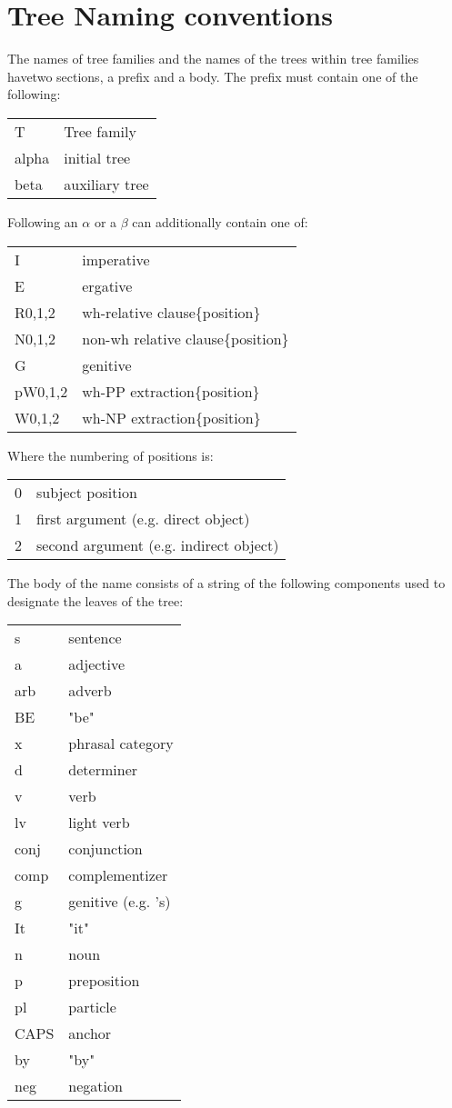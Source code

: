 \appendix
\section{Tree Naming conventions}

The names of tree families and the names of the trees within tree families havetwo sections, a prefix and a body. The prefix must contain one of the following:

\begin{tabular}{ll}
T&Tree family\\
alpha&initial tree\\
beta&auxiliary tree\\
\end{tabular}

Following an $\alpha$ or a $\beta$ can additionally contain one of:

\begin{tabular}{ll}
I&imperative\\
E&ergative\\
R{0,1,2}&wh-relative clause\{position\}\\
N{0,1,2}&non-wh relative clause\{position\}\\
G&genitive\\
pW{0,1,2}&wh-PP extraction\{position\}\\
W{0,1,2}&wh-NP extraction\{position\}\\
\end{tabular}

Where the numbering of positions is:
\begin{tabular}{ll}
0&subject position\\
1&first argument (e.g. direct object)\\
2&second argument (e.g. indirect object)\\
\end{tabular}

The body of the name consists of a string of the following components
used to designate the leaves of the tree:
\begin{tabular}{ll}
s&sentence\\
a&adjective\\
arb&adverb\\
BE&"be"\\
x&phrasal category\\
d&determiner\\
v&verb\\
lv&light verb\\
conj&conjunction\\
comp&complementizer\\
g&genitive (e.g. 's)\\
It&"it"\\
n&noun\\
p&preposition\\
pl&particle\\
CAPS&anchor\\
by&"by"\\
neg&negation\\
\end{tabular}




